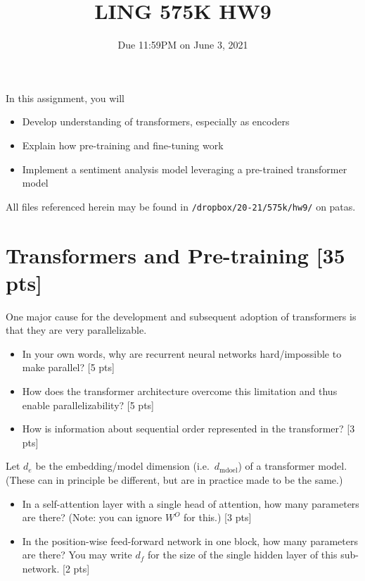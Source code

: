 \documentclass[11pt]{article}
\begin{document}
\title{LING 575K HW9}
\date{\vspace{-0.2in}Due 11:59PM on June 3, 2021}
\maketitle


\noindent In this assignment, you will 
\begin{itemize}
  \item Develop understanding of transformers, especially as encoders
  \item Explain how pre-training and fine-tuning work
  \item Implement a sentiment analysis model leveraging a pre-trained transformer model
\end{itemize}
All files referenced herein may be found in \texttt{/dropbox/20-21/575k/hw9/} on patas.


\section{Transformers and Pre-training [35 pts]}

 One major cause for the development and subsequent adoption of transformers is that they are very parallelizable.
\begin{itemize}
  \item In your own words, why are recurrent neural networks hard/impossible to make parallel? \hfill [5 pts]
  \item How does the transformer architecture overcome this limitation and thus enable parallelizability? \hfill [5 pts]
  \item How is information about sequential order represented in the transformer? \hfill [3 pts]
\end{itemize}

\vspace{2em}
 Let $d_e$ be the embedding/model dimension (i.e.\ $d_\text{mdoel}$) of a transformer model.  (These can in principle be different, but are in practice made to be the same.)
\begin{itemize}
  \item In a self-attention layer with a single head of attention, how many parameters are there? (Note: you can ignore $W^O$ for this.) \hfill [3 pts]
  \item In the position-wise feed-forward network in one block, how many parameters are there? You may write $d_f$ for the size of the single hidden layer of this sub-network. \hfill [2 pts]
\end{itemize}
\end{document}

